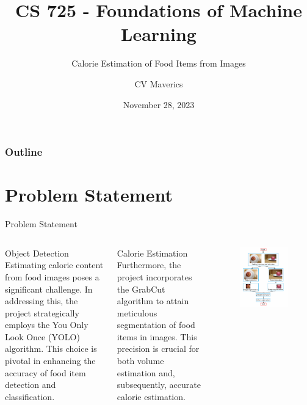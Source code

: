 \documentclass{beamer}
\title{CS 725 - Foundations of Machine Learning}
\subtitle{Calorie Estimation of Food Items from Images}
\author{CV Maverics}
\institute[IITB]{Indian Institute of Technology Bombay}
\date{November 28, 2023}
\begin{document}
	\begin{frame}
		\titlepage
	\end{frame}
	
	\begin{frame}
		\frametitle{Outline}
		\tableofcontents
	\end{frame}
	
	\section{Problem Statement}
	\begin{frame}{Problem Statement}
		\begin{columns}
			\column{0.5\textwidth}
			\begin{block}{Object Detection}
				\small Estimating calorie content from food images poses a significant challenge. In addressing this, the project strategically employs the You Only Look Once (YOLO) algorithm. This choice is pivotal in enhancing the accuracy of food item detection and classification.
			\end{block}
			\begin{block}{Calorie Estimation}
				\small Furthermore, the project incorporates the GrabCut algorithm to attain meticulous segmentation of food items in images. This precision is crucial for both volume estimation and, subsequently, accurate calorie estimation.
			\end{block}
			\column{0.45\textwidth}
			\begin{figure}
				\centering
				\includegraphics[scale=0.25]{roadmap.png}

\end{figure}
\end{columns}
\end{frame}
\end{document}
